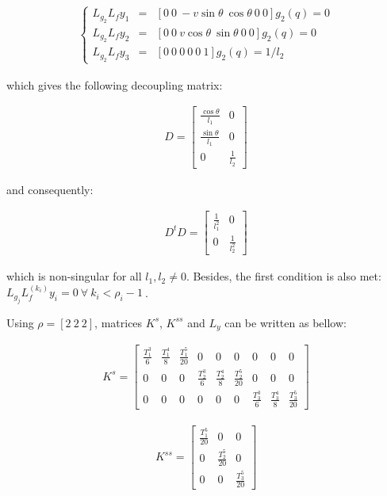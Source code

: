 \documentclass[letterpaper, 10 pt, conference]{ieeeconf}  %
\begin{document}
\begin{eqnarray}
\left\lbrace\begin{array}{lcl}
L_{g_2}L_{f}y_1 & = & [0\ 0\ -v\sin\theta\ \cos\theta\ 0\ 0]g_2(q) = 0\\
L_{g_2}L_{f}y_2 & = & [0\ 0\ v\cos\theta\ \sin\theta\ 0\ 0]g_2(q) = 0\\
L_{g_2}L_{f}y_3 & = & [0\ 0\ 0\ 0\ 0\ 1]g_2(q) = 1/l_2
\end{array}\right.
\end{eqnarray}

which gives the following decoupling matrix:

\begin{eqnarray}
D = 
\left[\begin{array}{cc}
\frac{\cos\theta}{l_1} & 0\\
\frac{\sin\theta}{l_1} & 0\\
0 & \frac{1}{l_2}
\end{array}\right]
\end{eqnarray}

and consequently:

\begin{eqnarray}
D^tD = 
\left[\begin{array}{cc}
\frac{1}{l_1^2} & 0\\
0 & \frac{1}{l_2^2}
\end{array}\right]
\end{eqnarray}

which is non-singular for all $l_1, l_2 \neq 0$. Besides, the first condition is also met: $L_{g_j}L^{(k_i)}_fy_i = 0\ \forall\ k_i < \rho_i-1\ $.

Using $\rho = [2\ 2\ 2]$, matrices $K^{s}$, $K^{ss}$ and $L_y$ can be written as bellow:

\begin{eqnarray}
K^s =
\left[\begin{array}{ccccccccc}
\frac{T_1^3}{6} & \frac{T_1^4}{8} & \frac{T_1^5}{20} & 0 & 0 & 0 & 0 & 0 & 0\\
0 & 0 & 0 & \frac{T_2^3}{6} & \frac{T_2^4}{8} & \frac{T_2^5}{20} & 0 & 0 & 0\\
0 & 0 & 0 & 0 & 0 & 0 & \frac{T_3^3}{6} & \frac{T_3^4}{8} & \frac{T_3^5}{20}
\end{array}\right]
\end{eqnarray}

\begin{eqnarray}
K^{ss} =
\left[\begin{array}{ccc}
\frac{T_1^5}{20} & 0 & 0\\
0 & \frac{T_2^5}{20} & 0\\
0 & 0 & \frac{T_3^5}{20}
\end{array}\right]
\end{eqnarray}
\end{document}
